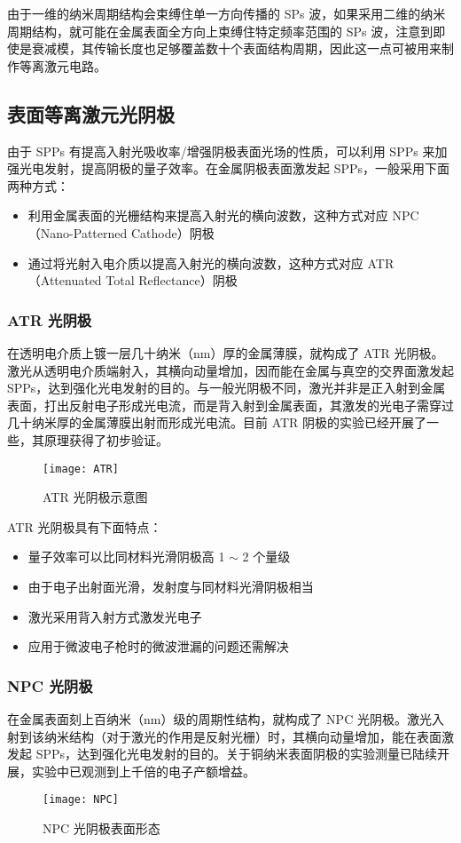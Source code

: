 由于一维的纳米周期结构会束缚住单一方向传播的 SPs 波，如果采用二维的纳米周期结构，就可能在金属表面全方向上束缚住特定频率范围的 SPs 波，注意到即使是衰减模，其传输长度也足够覆盖数十个表面结构周期，因此这一点可被用来制作等离激元电路。

\subsection{表面等离激元光阴极}
由于 SPPs 有提高入射光吸收率/增强阴极表面光场的性质，可以利用 SPPs 来加强光电发射，提高阴极的量子效率。在金属阴极表面激发起 SPPs，一般采用下面两种方式：
\begin{itemize}
	\item 利用金属表面的光栅结构来提高入射光的横向波数，这种方式对应 NPC（Nano-Patterned Cathode）阴极
	\item 通过将光射入电介质以提高入射光的横向波数，这种方式对应 ATR（Attenuated Total Reflectance）阴极
\end{itemize}

\subsubsection{ATR 光阴极}
在透明电介质上镀一层几十纳米（nm）厚的金属薄膜，就构成了 ATR 光阴极。激光从透明电介质端射入，其横向动量增加，因而能在金属与真空的交界面激发起 SPPs，达到强化光电发射的目的\cite{Sipe:1981aa}。与一般光阴极不同，激光并非是正入射到金属表面，打出反射电子形成光电流，而是背入射到金属表面，其激发的光电子需穿过几十纳米厚的金属薄膜出射而形成光电流。目前 ATR 阴极的实验已经开展了一些，其原理获得了初步验证\cite{Chen:2011aa,Watanabe:2011aa,Neo:2012aa}。
\begin{figure}[htbp]
\centering
\texttt{[image: ATR]}
\caption{\label{fig:NPC} ATR 光阴极示意图\cite{Watanabe:2011aa}}
\end{figure}
	
ATR 光阴极具有下面特点：
\begin{itemize}
	\item 量子效率可以比同材料光滑阴极高 1 $\sim$ 2 个量级
	\item 由于电子出射面光滑，发射度与同材料光滑阴极相当
	\item 激光采用背入射方式激发光电子
	\item 应用于微波电子枪时的微波泄漏的问题还需解决
\end{itemize}

\subsubsection{NPC 光阴极}
在金属表面刻上百纳米（nm）级的周期性结构，就构成了 NPC 光阴极。激光入射到该纳米结构（对于激光的作用是反射光栅）时，其横向动量增加，能在表面激发起 SPPs，达到强化光电发射的目的。关于铜纳米表面阴极的实验测量已陆续开展，实验中已观测到上千倍的电子产额增益\cite{Polyakov:2013aa,Li:2013aa}。
\begin{figure}[htbp]
\centering
\texttt{[image: NPC]}
\caption{\label{fig:NPC} NPC 光阴极表面形态}
\end{figure}

